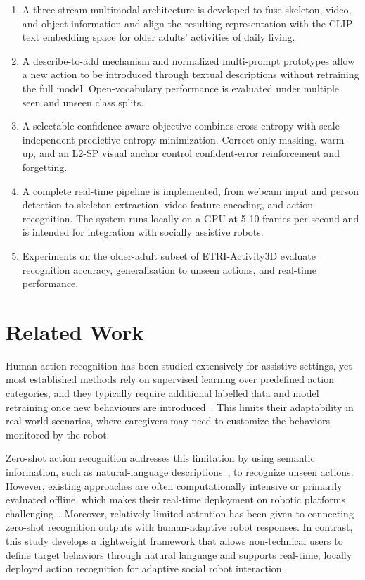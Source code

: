 \documentclass[conference]{IEEEtran}
\begin{document}
\begin{enumerate}
    \item A three-stream multimodal architecture is developed to fuse skeleton, video, and object information and align the resulting representation with the CLIP text embedding space for older adults' activities of daily living.
    \item A describe-to-add mechanism and normalized multi-prompt prototypes allow a new action to be introduced through textual descriptions without retraining the full model. Open-vocabulary performance is evaluated under multiple seen and unseen class splits.
    \item A selectable confidence-aware objective combines cross-entropy with scale-independent predictive-entropy minimization. Correct-only masking, warm-up, and an L2-SP visual anchor control confident-error reinforcement and forgetting.
    \item A complete real-time pipeline is implemented, from webcam input and person detection to skeleton extraction, video feature encoding, and action recognition. The system runs locally on a GPU at 5-10 frames per second and is intended for integration with socially assistive robots.
    \item Experiments on the older-adult subset of ETRI-Activity3D evaluate recognition accuracy, generalisation to unseen actions, and real-time performance.
\end{enumerate}


\section{Related Work}

Human action recognition has been studied extensively for assistive settings, yet most established methods rely on supervised learning over predefined action categories, and they typically require additional labelled data and model retraining once new behaviours are introduced~\cite{simonyan2014twostream,tran2015c3d,wang2016tsn,carreira2017i3d,yan2018stgcn,shi2019agcn,chen2021ctrgcn}. This limits their adaptability in real-world scenarios, where caregivers may need to customize the behaviors monitored by the robot.

Zero-shot action recognition addresses this limitation by using semantic information, such as natural-language descriptions~\cite{zhu2024purls,gupta2021synse}, to recognize unseen actions. However, existing approaches are often computationally intensive or primarily evaluated offline, which makes their real-time deployment on robotic platforms challenging~\cite{zhou2025pgfa,do2025tdsm}. Moreover, relatively limited attention has been given to connecting zero-shot recognition outputs with human-adaptive robot responses. In contrast, this study develops a lightweight framework that allows non-technical users to define target behaviors through natural language and supports real-time, locally deployed action recognition for adaptive social robot interaction.
\end{document}
